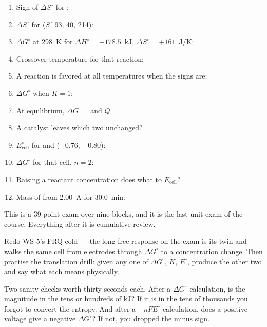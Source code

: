 \documentclass{apchem-worksheet}
\begin{document}
\begin{enumerate}[leftmargin=*,itemsep=0.34em]
  \item Sign of $\Delta S^\circ$ for :
  \item $\Delta S^\circ$ for 
        ($S^\circ$ 93, 40, 214): 
  \item $\Delta G^\circ$ at \SI{298}{\kelvin} for
        $\Delta H^\circ = +178.5$~kJ, $\Delta S^\circ = +161$~J/K:
  \item Crossover temperature for that reaction:
  \item A reaction is favored at all temperatures when the signs are:
  \item $\Delta G^\circ$ when $K = 1$: 
  \item At equilibrium, $\Delta G = $  and
        $Q = $ 
  \item A catalyst leaves which two unchanged?
  \item $E^\circ_{\text{cell}}$ for  and 
        ($-0.76$, $+0.80$): 
  \item $\Delta G^\circ$ for that cell, $n = 2$:
  \item Raising a reactant concentration does what to $E_{\text{cell}}$?
  \item Mass of  from \SI{2.00}{\ampere} for \SI{30.0}{\minute}:
\end{enumerate}

\begin{apcnote}
This is a 39-point exam over nine blocks, and it is the last unit exam of
the course. Everything after it is cumulative review.

Redo WS 5's FRQ cold --- the long free-response on the exam is its twin and
walks the same cell from electrodes through $\Delta G^\circ$ to a
concentration change. Then practise the translation drill: given any one of
$\Delta G^\circ$, $K$, $E^\circ$, produce the other two and say what each
means physically.

Two sanity checks worth thirty seconds each. After a $\Delta G^\circ$
calculation, is the magnitude in the tens or hundreds of kJ? If it is in
the tens of thousands you forgot to convert the entropy. And after a
$-nFE^\circ$ calculation, does a positive voltage give a negative
$\Delta G^\circ$? If not, you dropped the minus sign.
\end{apcnote}
\end{document}
